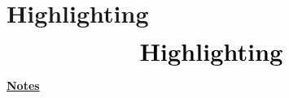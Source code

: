 \documentclass[10pt]{beamer}
\begin{document}
\section{Highlighting}
\begin{frame}
	\begin{eqnarray*}
		&\text{{\huge \textbf{Highlighting}}}\\
	\end{eqnarray*}
\end{frame}
\begin{flushleft}
	\underline{\textbf{Notes}}\setlength{\parskip}{.15cm}\notesize\newline\par
\end{flushleft}

\end{document}
